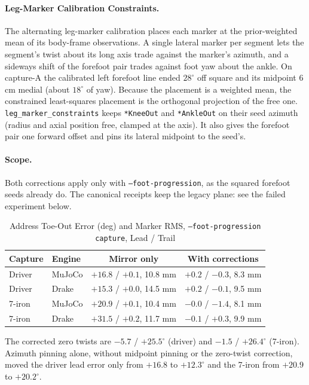 \documentclass[11pt]{article}
\begin{document}
\paragraph{Leg-Marker Calibration Constraints.} The alternating leg-marker
calibration places each marker at the prior-weighted mean of its body-frame
observations. A single lateral marker per segment lets the segment's twist
about its long axis trade against the marker's azimuth, and a sideways shift
of the forefoot pair trades against foot yaw about the ankle. On capture-A
the calibrated left forefoot line ended $28^\circ$ off square and its
midpoint 6 cm medial (about $18^\circ$ of yaw). Because the placement is a
weighted mean, the constrained least-squares placement is the orthogonal
projection of the free one. \texttt{leg\_marker\_constraints} keeps
\texttt{*KneeOut} and \texttt{*AnkleOut} on their seed azimuth (radius and
axial position free, clamped at the axis). It also gives the forefoot pair
one forward offset and pins its lateral midpoint to the seed's.

\paragraph{Scope.} Both corrections apply only with
\texttt{--foot-progression}, as the squared forefoot seeds already do. The
canonical receipts keep the legacy plane: see the failed experiment below.

\begin{table}[h]
\centering
\caption{Address Toe-Out Error (deg) and Marker RMS, \texttt{--foot-progression capture}, Lead / Trail}
\label{tab:feet2}
\begin{tabular}{llcc}
\toprule
Capture & Engine & Mirror only & With corrections \\
\midrule
Driver & MuJoCo & $+16.8$ / $+0.1$, 10.8 mm & $+0.2$ / $-0.3$, 8.3 mm \\
Driver & Drake & $+15.3$ / $+0.0$, 14.5 mm & $+0.2$ / $-0.1$, 9.5 mm \\
7-iron & MuJoCo & $+20.9$ / $+0.1$, 10.4 mm & $-0.0$ / $-1.4$, 8.1 mm \\
7-iron & Drake & $+31.5$ / $+0.2$, 11.7 mm & $-0.1$ / $+0.3$, 9.9 mm \\
\bottomrule
\end{tabular}
\end{table}

The corrected zero twists are $-5.7$ / $+25.5^\circ$ (driver) and $-1.5$ /
$+26.4^\circ$ (7-iron). Azimuth pinning alone, without midpoint pinning or
the zero-twist correction, moved the driver lead error only from $+16.8$ to
$+12.3^\circ$ and the 7-iron from $+20.9$ to $+20.2^\circ$.
\end{document}
